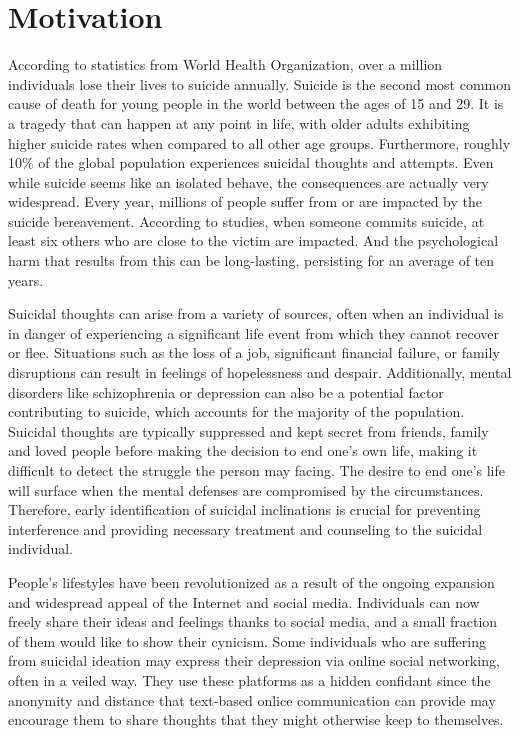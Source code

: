 \documentclass[ %
                    author={Bocheng Wang},
                supervisor={Dr. Qiang Liu},
                    degree={MSc},
                     title={A Research on Identification of Suicide Ideation in Texts with Multiple Models},
                      type={},
                      year={2024}]{dissertation}
\begin{document}
\section{Motivation}
\noindent
According to statistics from World Health Organization, over a million individuals lose their lives to suicide annually. Suicide is the second most common cause of death for young people in the world between the ages of 15 and 29. It is a tragedy that can happen at any point in life, with older adults exhibiting higher suicide rates when compared to all other age groups. Furthermore, roughly 10\% of the global population experiences suicidal thoughts and attempts. Even while suicide seems like an isolated behave, the consequences are actually very widespread. Every year, millions of people suffer from or are impacted by the suicide bereavement. According to studies, when someone commits suicide, at least six others who are close to the victim are impacted. And the psychological harm that results from this can be long-lasting, persisting for an average of ten years.

Suicidal thoughts can arise from a variety of sources, often when an individual is in danger of experiencing a significant life event from which they cannot recover or flee. Situations such as the loss of a job, significant financial failure, or family disruptions can result in feelings of hopelessness and despair. Additionally, mental disorders like schizophrenia or depression can also be a potential factor contributing to suicide, which accounts for the majority of the population. Suicidal thoughts are typically suppressed and kept secret from friends, family and loved people before making the decision to end one's own life, making it difficult to detect the struggle the person may facing. The desire to end one's life will surface when the mental defenses are compromised by the circumstances. Therefore, early identification of suicidal inclinations is crucial for preventing interference and providing necessary treatment and counseling to the suicidal individual.

People's lifestyles have been revolutionized as a result of the ongoing expansion and widespread appeal of the Internet and social media. Individuals can now freely share their ideas and feelings thanks to social media, and a small fraction of them would like to show their cynicism. Some individuals who are suffering from suicidal ideation may express their depression via online social networking, often in a veiled way. They use these platforms as a hidden confidant since the anonymity and distance that text-based onlice communication can provide may encourage them to share thoughts that they might otherwise keep to themselves.
\end{document}
